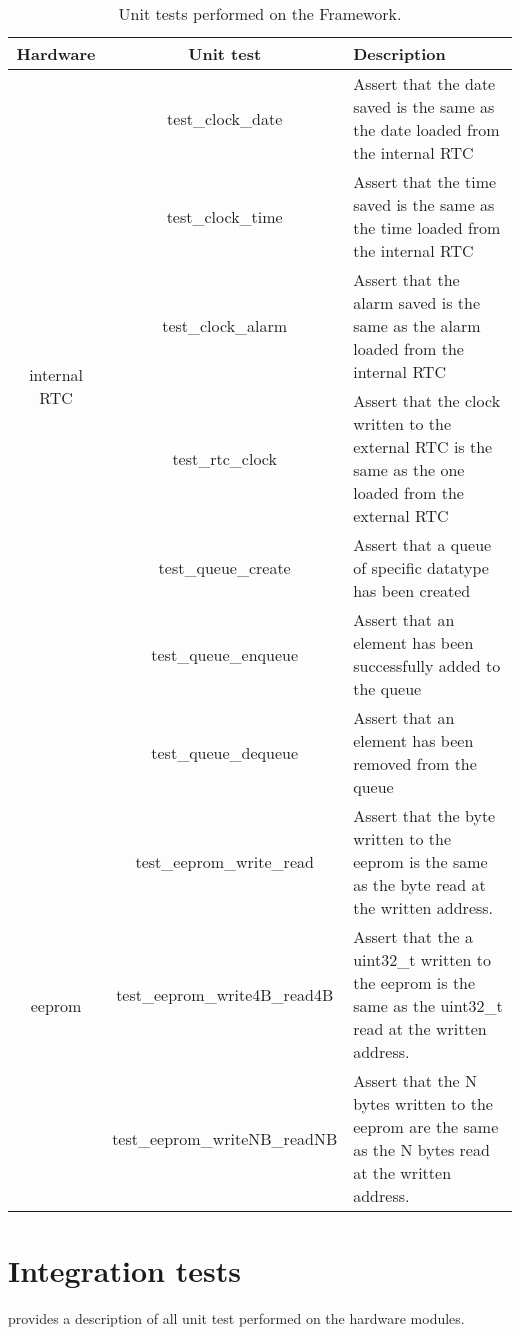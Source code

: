 \begin{table}[h!]
\centering
\caption{Unit tests performed on the Framework.}
\label{table:unitTest}
\begin{tabular}{ccp{18em}}
\hline
\hline
\textbf{Hardware} & \textbf{Unit test} & \textbf{Description}\\
\hline
\toprule
\multirow{6}{*}{internal RTC} & test\_clock\_date & Assert that the date saved is the same as the date loaded from the internal RTC\\
& test\_clock\_time & Assert that the time saved is the same as the time loaded from the internal RTC\\ 
& test\_clock\_alarm & Assert that the alarm saved is the same as the alarm loaded from the internal RTC\\
\midrule
\multirow{3}{*}{external RTC} & test\_rtc\_clock & Assert that the clock written to the external RTC is the same as the one loaded from the external RTC\\
\midrule
\multirow{6}{*}{queue} & test\_queue\_create & Assert that a queue of specific datatype has been created\\
& test\_queue\_enqueue & Assert that an element has been successfully added to the queue\\ 
& test\_queue\_dequeue & Assert that an element has been removed from the queue\\
\midrule
\multirow{9}{*}{eeprom} & test\_eeprom\_write\_read & Assert that the byte written to the eeprom is the same as the byte read at the written address.\\
& test\_eeprom\_write4B\_read4B & Assert that the a uint32\_t written to the eeprom is the same as the uint32\_t read at the written address.\\
& test\_eeprom\_writeNB\_readNB & Assert that the N bytes written to the eeprom are the same as the N bytes read at the written address.\\
\hline
\hline
\end{tabular}
\end{table}

\section{Integration tests}
 provides a description of all unit test performed on the hardware modules. 


